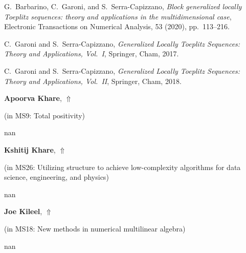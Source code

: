 \documentclass[ILAS2025-program.tex]{subfiles}
\begin{document}
\begin{ilasabstract}
\begin{bibunit}
\begin{thebibliography}{99}
G.~Barbarino, C.~Garoni, and S.~Serra-Capizzano,
\textit{Block generalized locally Toeplitz sequences: theory and applications in the multidimensional case},
Electronic Transactions on Numerical Analysis, 53 (2020), pp.~113--216.

C.~Garoni and S.~Serra-Capizzano,
\textit{Generalized Locally Toeplitz Sequences: Theory and Applications, Vol.~I},
Springer, Cham, 2017.

C.~Garoni and S.~Serra-Capizzano,
\textit{Generalized Locally Toeplitz Sequences: Theory and Applications, Vol.~II},
Springer, Cham, 2018.


\end{thebibliography}
        \end{bibunit}
        \end{ilasabstract}
     \hypertarget{down0012}{}\begin{ilasabstract}
    
    \textbf{Apoorva Khare},  \hfill \hyperlink{up0012}{$\Uparrow$}
    
    (in {\color{mstitle}MS9: Total positivity})
        
        \mtskip
    nan\end{ilasabstract}
     \hypertarget{down0136}{}\begin{ilasabstract}
    
    \textbf{Kshitij Khare},  \hfill \hyperlink{up0136}{$\Uparrow$}
    
    (in {\color{mstitle}MS26: Utilizing structure to achieve low-complexity algorithms for data science, engineering, and physics})
        
        \mtskip
    nan\end{ilasabstract}
     \hypertarget{down0189}{}\begin{ilasabstract}
    
    \textbf{Joe Kileel},  \hfill \hyperlink{up0189}{$\Uparrow$}
    
    (in {\color{mstitle}MS18: New methods in numerical multilinear algebra})
        
        \mtskip
    nan\end{ilasabstract}
\end{document}
